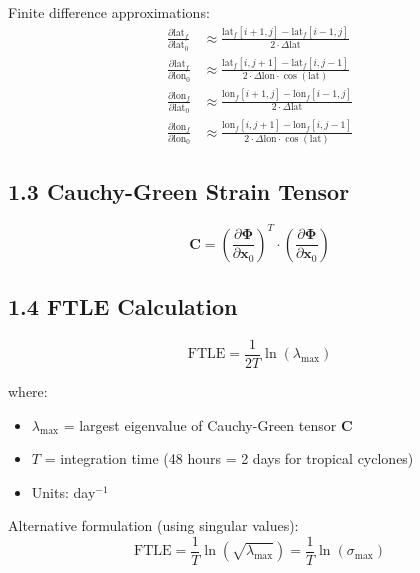 \documentclass{article}
\begin{document}
Finite difference approximations:
\begin{align}
\frac{\partial \text{lat}_f}{\partial \text{lat}_0} &\approx \frac{\text{lat}_f[i+1,j] - \text{lat}_f[i-1,j]}{2 \cdot \Delta \text{lat}} \\
\frac{\partial \text{lat}_f}{\partial \text{lon}_0} &\approx \frac{\text{lat}_f[i,j+1] - \text{lat}_f[i,j-1]}{2 \cdot \Delta \text{lon} \cdot \cos(\text{lat})} \\
\frac{\partial \text{lon}_f}{\partial \text{lat}_0} &\approx \frac{\text{lon}_f[i+1,j] - \text{lon}_f[i-1,j]}{2 \cdot \Delta \text{lat}} \\
\frac{\partial \text{lon}_f}{\partial \text{lon}_0} &\approx \frac{\text{lon}_f[i,j+1] - \text{lon}_f[i,j-1]}{2 \cdot \Delta \text{lon} \cdot \cos(\text{lat})}
\end{align}

\subsection*{1.3 Cauchy-Green Strain Tensor}

\begin{equation}
\bm{C} = \left(\frac{\partial \bm{\Phi}}{\partial \bm{x}_0}\right)^T \cdot \left(\frac{\partial \bm{\Phi}}{\partial \bm{x}_0}\right)
\end{equation}

\subsection*{1.4 FTLE Calculation}

\begin{equation}
\boxed{
\text{FTLE} = \frac{1}{2T} \ln(\lambda_{\max})
}
\end{equation}

where:
\begin{itemize}
    \item $\lambda_{\max}$ = largest eigenvalue of Cauchy-Green tensor $\bm{C}$
    \item $T$ = integration time (48 hours = 2 days for tropical cyclones)
    \item Units: day$^{-1}$
\end{itemize}

Alternative formulation (using singular values):
\begin{equation}
\text{FTLE} = \frac{1}{T} \ln\left(\sqrt{\lambda_{\max}}\right) = \frac{1}{T} \ln(\sigma_{\max})
\end{equation}
\end{document}
